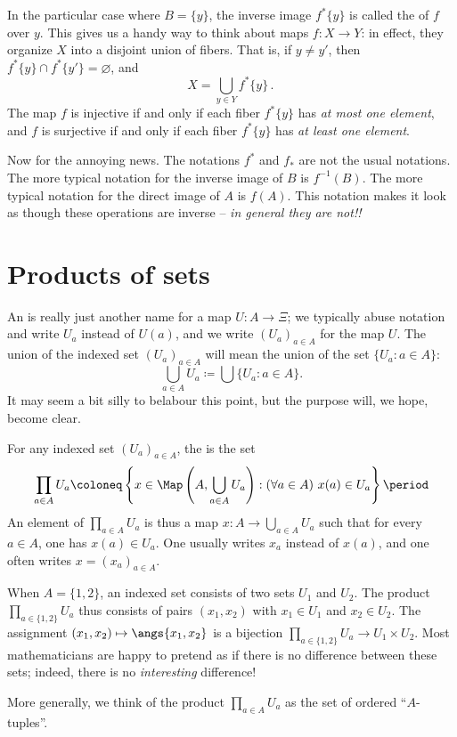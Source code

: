 In the particular case where $B = \{y\}$, the inverse image $f^{\ast}\{y\}$ is called the  of $f$ over $y$.
This gives us a handy way to think about maps $f \colon X \to Y $:
in effect, they organize $X$ into a disjoint union of fibers.
That is, if $ y \neq y'$, then $f^{\ast}\{y\} \cap f^{\ast}\{y'\} = \varnothing $, and
\[
	X = \bigcup_{y \in Y} f^{\ast}\{y\} \period
\]
The map $f$ is injective if and only if each fiber $f^{\ast} \{y\}$ has \emph{at most one element}, and 
$f$ is surjective if and only if each fiber $f^{\ast} \{y\}$ has \emph{at least one element}.

\begin{wrn}
	Now for the annoying news.
	The notations $f^{\ast}$ and $f_{\ast}$ are not the usual notations.
	The more typical notation for the inverse image of $B$ is $f^{-1}(B)$.
	The more typical notation for the direct image of $A$ is $f(A)$.
	This notation makes it look as though these operations are inverse -- \emph{in general they are not!!}
\end{wrn}

\section{Products of sets}%
\label{sec:products_of_sets}

An  is really just another name for a map%
$U\colon A \to \Xi$;
we typically abuse notation and write $U_a$ instead of $U(a)$, and we write $(U_a)_{a\in A}$ for the map $U$.
The union of the indexed set $(U_a)_{a\in A}$ will mean the union of the set $\{U_a : a\in A\}$:
\[
	\bigcup_{a\in A}U_a\coloneq\bigcup\{U_a : a\in A\}.
\]
It may seem a bit silly to belabour this point, but the purpose will, we hope, become clear.

For any indexed set $(U_a)_{a\in A}$, the  is the set
\[
	\prod_{a\in A} U_a \coloneq \left\{x \in \Map\left(A,\bigcup_{a\in A}U_a\right) : (\forall a\in A)\ x(a)\in U_a\right\} \period
\]
An element of $\prod_{a \in A} U_a $ is thus a map $ x \colon A \to \bigcup_{a \in A} U_a $ such that for every $a \in A$, one has $x(a) \in U_a$.
One usually writes $x_a$ instead of $x(a)$, and one often writes $x = (x_a)_{a\in A}$.

\begin{exm}
	When $A = \{1,2\}$, an indexed set consists of two sets $U_1$ and $U_2$.
	The product $\prod_{a \in \{1,2\}} U_a$ thus consists of pairs $(x_1, x_2)$ with $x_1 \in U_1$ and $x_2 \in U_2$.
	The assignment $(x_1,x_2) \mapsto \angs{x_1,x_2}$ is a bijection $\prod_{a \in \{1,2\}} U_a \to U_1 \times U_2$.
	Most mathematicians are happy to pretend as if there is no difference between these sets;
	indeed, there is no \emph{interesting} difference!
\end{exm}
More generally, we think of the product $\prod_{a\in A} U_a$ as the set of ordered \enquote{$A$-tuples}.

